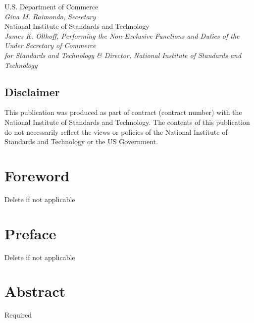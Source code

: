 \documentclass[12pt]{article}
\begin{document}
\begin{titlepage}
\begin{flushright}
		\vfill
		\footnotesize U.S. Department of Commerce\\ 
		\textit{Gina M. Raimondo, Secretary}\\
		\vspace{10pt}
		National Institute of Standards and Technology\\ 
		\hspace*{-3cm}\textit{James K. Olthoff, Performing the Non-Exclusive Functions and Duties of the Under Secretary of Commerce \\
for Standards and Technology \& Director, National Institute of Standards and Technology}  
	\end{flushright}
\end{titlepage}

	\begin{titlepage}
		\section*{Disclaimer} This publication was produced as part of contract (contract number) with the National Institute of Standards and Technology. The contents of this publication do not necessarily reflect the views or policies of the National Institute of Standards and Technology or the US Government.\\ 
		\vfill
		
	\end{titlepage}
\section*{Foreword}
\normalsize Delete if not applicable\\
\section*{Preface}
\normalsize Delete if not applicable\\
\section*{Abstract}
\normalsize Required\\
\end{document}

